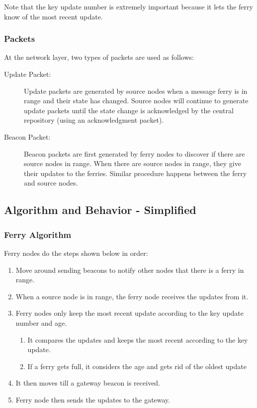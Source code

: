 Note that the key update number is extremely important because it lets the ferry know of the most recent update.


\subsubsection{Packets}

At the network layer, two types of packets are used as follows:

\begin{description}
\item[Update Packet: ]
Update packets are generated by source nodes when a message ferry is in range and their state has changed. 
Source nodes will continue to generate update packets until the state change is acknowledged by the central repository (using an acknowledgment packet).
\item[Beacon Packet: ] 
Beacon packets are first generated by ferry nodes to discover if there are source nodes in range. 
When there are source nodes in range, they give their updates to the ferries. Similar procedure happens between the ferry and source nodes. 
\end{description}

\subsection{Algorithm and Behavior - Simplified}

\subsubsection{Ferry Algorithm}

Ferry nodes do the steps shown below in order:

\begin{enumerate}
\item Move around sending beacons to notify other nodes that there is a ferry in range.
\item When a source node is in range, the ferry node receives the updates from it.
\item Ferry nodes only keep the most recent update according to the key update number and age.
	\begin{enumerate}
	\item It compares the updates and keeps the most recent according to the key update.
	\item If a ferry gets full, it considers the age and gets rid of the oldest update
	\end{enumerate}
\item It then moves till a gateway beacon is received.
\item Ferry node then sends the updates to the gateway.
\end{enumerate}

